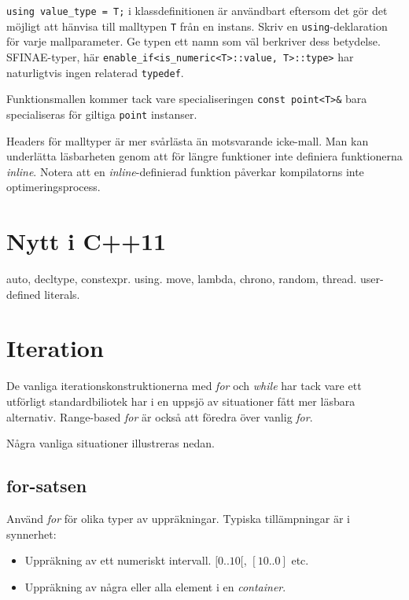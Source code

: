 \documentclass[a4paper,portrait]{miunart} %
\begin{document}
\texttt{using value\_type = T;} i klassdefinitionen är användbart eftersom det 
gör det möjligt att hänvisa till malltypen \texttt{T} från en instans. Skriv en 
\texttt{using}-deklaration för varje mallparameter. Ge typen ett namn som väl 
berkriver dess betydelse.  SFINAE-typer, här 
\texttt{enable\_if<is\_numeric<T>::value, T>::type>} har naturligtvis 
ingen relaterad \texttt{typedef}. 

Funktionsmallen kommer tack vare specialiseringen \texttt{const point<T>\&} 
bara specialiseras för giltiga \texttt{point} instanser.

Headers för malltyper är mer svårlästa än motsvarande icke-mall. Man kan 
underlätta läsbarheten genom att för längre funktioner inte definiera 
funktionerna \emph{inline}. Notera att en \emph{inline}-definierad funktion 
påverkar kompilatorns inte optimeringsprocess. 


\pagebreak
\section{Nytt i C++11}
\label{sec:new-stuff}
auto, decltype, constexpr. using.
move,
lambda,
chrono,
random,
thread.
user-defined literals.

\pagebreak
\section{Iteration}
\label{sec:iteration}

De vanliga iterationskonstruktionerna med \emph{for} och \emph{while} har tack 
vare ett utförligt standardbiliotek har i en uppsjö av situationer fått mer 
läsbara alternativ. Range-based \emph{for} är också att föredra över vanlig 
\emph{for}.

Några vanliga situationer illustreras nedan.  

\subsection{for-satsen}
\label{sec:iteration:for}

Använd \emph{for} för olika typer av uppräkningar. Typiska tillämpningar är 
i synnerhet:
\begin{itemize}
	\item{Uppräkning av ett numeriskt intervall. $[0..10[$, $[10..0]$ etc.}
	\item{Uppräkning av några eller alla element i en \emph{container}.}
\end{itemize}
			
\end{document}
